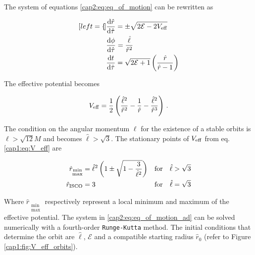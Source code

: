 The system of equations \ref{cap2:eq:eq_of_motion} can be rewritten as

\begin{subequations}
    \begin{align}[left = {\empheqlbrace}]
        &\dv{\hat r}{\hat \tau} = \pm \sqrt{2 \mathcal E - 2 V_{\rm eff}}
        \label{cap2:eq:radial_eq_as} \\
        &\dv{\phi}{\hat \tau} = \frac{\hat \ell}{\hat r^2}
        \label{cap2:eq:angular_eq_dimless} \\
        &\dv{t}{\hat \tau} = \sqrt{2 \mathcal E + 1}
        \left(\frac{\hat r}{\hat r - 1}\right) \label{cap2:eq:time_eq_dimless}
    \end{align}
    \label{cap2:eq:eq_of_motion_ad}
\end{subequations}

The effective potential becomes

\begin{equation}
    V_{\rm eff} = \frac{1}{2} \left(\frac{\hat \ell^2}{\hat r^2}
    - \frac{1}{\hat r} - \frac{\hat \ell^2}{\hat r^3} \right) \, .
    \label{cap2:eq:V_eff}
\end{equation}

The condition on the angular momentum $\ell$ for the existence of a stable
orbits is $\ell > \sqrt{12} M$ and becomes $\hat \ell > \sqrt{3}$.
The stationary points of $V_{\rm eff}$ from eq. \ref{cap1:eq:V_eff} are

\begin{subequations}
    \begin{align}
        \hat r_{\substack{\text{min} \\ \text{max}}} &= \hat \ell^2
        \left(1 \pm \sqrt{1 - \frac{3}{\hat \ell^2}} \right)
        &&{\rm for} \quad \hat \ell > \sqrt{3} \\
        \hat r_{\rm ISCO} &= 3
        &&{\rm for} \quad \hat \ell = \sqrt{3}
    \end{align}
\end{subequations}

Where $\hat r_{\substack{\text{min} \\ \text{max}}}$ respectively represent a
local minimum and maximum of the effective potential.
The system in \ref{cap2:eq:eq_of_motion_ad} can be solved numerically with
a fourth-order \texttt{Runge-Kutta} method.
The initial conditions that determine the orbit are $\hat \ell$,
$\mathcal E$ and a compatible starting radius $\hat r_0$ (refer to Figure
\ref{cap1:fig:V_eff_orbits}).

